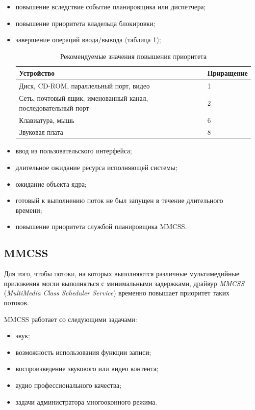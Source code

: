 \begin{itemize}
    \item повышение вследствие событие планировщика или диспетчера;
    \item повышение приоритета владельца блокировки;
    \item завершение операций ввода/вывода (таблица \ref{tab:input-output});
    
\begin{table}[H]
    \caption{Рекомендуемые значения повышения приоритета}
    \begin{center}
        \begin{tabular}{|p{100mm}|l|}
            \hline
            \textbf{Устройство} & \textbf{Приращение} \\\hline
            Диск, CD-ROM, параллельный порт, видео & 1 \\ \hline
            Сеть, почтовый ящик, именованный канал, последовательный порт & 2 \\ \hline
            Клавиатура, мышь & 6 \\ \hline
            Звуковая плата & 8 \\ \hline
        \end{tabular}
    \end{center}
    \label{tab:input-output}
\end{table}
    \item ввод из пользовательского интерфейса;
    \item длительное ожидание ресурса исполняющей системы;
    \item ожидание объекта ядра;
    \item готовый к выполнению поток не был запущен в течение длительного времени;
    \item повышение приоритета службой планировщика MMCSS.
\end{itemize}

\subsection{MMCSS}

Для того, чтобы потоки, на которых выполняются различные мультимедийные приложения могли выполняться с минимальными задержками, драйвур \textit{MMCSS} (\textit{MultiMedia Class Scheduler Service}) временно повышает приоритет таких потоков.

MMCSS работает со следующими задачами:

\begin{itemize}
	\item звук;
	\item возможность использования функции записи;
	\item воспроизведение звукового или видео контента;
	\item аудио профессионального качества;
	\item задачи администратора многооконного режима.
\end{itemize}

